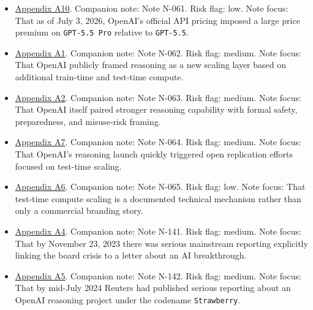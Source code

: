 \documentclass[
  american,
  11pt,
  letterpaper,
]{article}
\begin{document}
\begin{itemize}
  \hyperref[ch-06-appendix-a8-it-s-not-that-simple-an-analysis-of-simple-test-time-scaling]{Appendix
  A8}. Companion note: Note N-060. Risk flag: low. Note focus: That
  there is direct technical pushback against simplistic claims that
  frontier reasoning was trivially replicated.
\item
  \hyperref[ch-06-appendix-a10-pricing-openai-api]{Appendix A10}.
  Companion note: Note N-061. Risk flag: low. Note focus: That as of
  July 3, 2026, OpenAI's official API pricing imposed a large price
  premium on \texttt{GPT-5.5\ Pro} relative to \texttt{GPT-5.5}.
\item
  \hyperref[ch-06-appendix-a1-learning-to-reason-with-llms]{Appendix
  A1}. Companion note: Note N-062. Risk flag: medium. Note focus: That
  OpenAI publicly framed reasoning as a new scaling layer based on
  additional train-time and test-time compute.
\item
  \hyperref[ch-06-appendix-a2-openai-o1-system-card]{Appendix A2}.
  Companion note: Note N-063. Risk flag: medium. Note focus: That OpenAI
  itself paired stronger reasoning capability with formal safety,
  preparedness, and misuse-risk framing.
\item
  \hyperref[ch-06-appendix-a7-s1-simple-test-time-scaling]{Appendix A7}.
  Companion note: Note N-064. Risk flag: medium. Note focus: That
  OpenAI's reasoning launch quickly triggered open replication efforts
  focused on test-time scaling.
\item
  \hyperref[ch-06-appendix-a6-scaling-llm-test-time-compute-optimally-can-be-more-effective-than-scaling-model-parameters]{Appendix
  A6}. Companion note: Note N-065. Risk flag: low. Note focus: That
  test-time compute scaling is a documented technical mechanism rather
  than only a commercial branding story.
\item
  \hyperref[ch-06-appendix-a4-openai-researchers-warned-board-of-ai-breakthrough-ahead-of-ceo-ouster-sources-say]{Appendix
  A4}. Companion note: Note N-141. Risk flag: medium. Note focus: That
  by November 23, 2023 there was serious mainstream reporting explicitly
  linking the board crisis to a letter about an AI breakthrough.
\item
  \hyperref[ch-06-appendix-a5-exclusive-openai-working-on-new-reasoning-technology-under-code-name-strawberry]{Appendix
  A5}. Companion note: Note N-142. Risk flag: medium. Note focus: That
  by mid-July 2024 Reuters had published serious reporting about an
  OpenAI reasoning project under the codename \texttt{Strawberry}.
\end{itemize}
\end{document}
